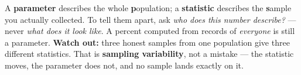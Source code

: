 \documentclass[12pt]{article}
\begin{document}
\vspace{0.14in}

\begin{remindbox}
\small
A \textbf{parameter} describes the whole \textbf{p}opulation; a \textbf{statistic} describes the
\textbf{s}ample you actually collected. To tell them apart, ask \emph{who does this number
describe?} --- never \emph{what does it look like}. A percent computed from records of
\emph{everyone} is still a parameter. \textbf{Watch out:} three honest samples from one
population give three different statistics. That is \textbf{sampling variability}, not a
mistake --- the statistic moves, the parameter does not, and no sample lands exactly on it.
\end{remindbox}
\end{document}
